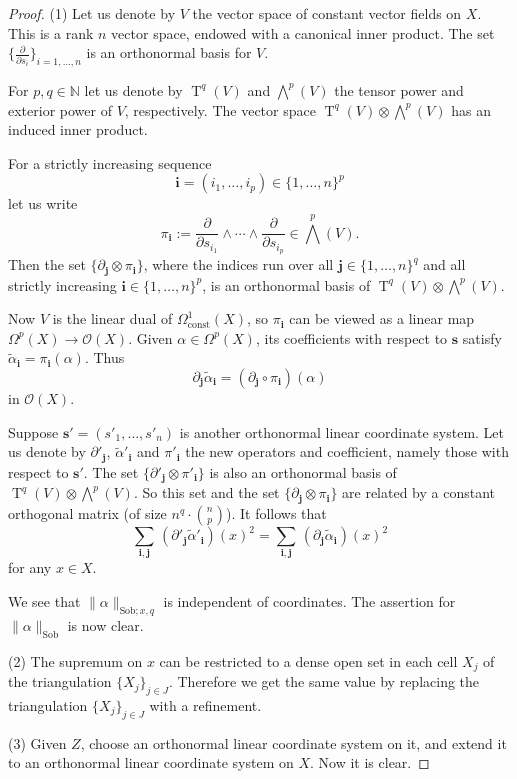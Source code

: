\documentclass[10pt, a4paper]{amsart}
\theoremstyle{definition}
\numberwithin{equation}{section}
\newcommand{\opn}{\operatorname}
\newcommand{\mcal}[1]{\mathcal{#1}}
\newcommand{\mrm}[1]{\mathrm{#1}}
\newcommand{\mbb}[1]{\mathbb{#1}}
\newcommand{\smfrac}[2]{{\textstyle \frac{#1}{#2}}}
\newcommand{\bsym}[1]{\boldsymbol{#1}}
\newcommand{\til}[1]{\tilde{#1}}
\newcommand{\norm}[1]{\lVert #1 \rVert}
\newcommand{\N}{\mbb{N}}
\newcommand{\bwedge}{{\textstyle \bigwedge}}
\begin{document}
\begin{proof}
(1) Let us denote by $V$ the vector space of constant vector fields on $X$.
This is a rank $n$ vector space, endowed with a canonical inner product. The
set $\{ \smfrac{\partial}{\partial s_i} \}_{i = 1, \ldots, n}$
is an orthonormal basis for $V$. 

For $p, q \in \N$ let us denote by $\opn{T}^q(V)$ and $\bwedge^p(V)$ the 
tensor  power and exterior power of $V$, respectively. The vector space
$\opn{T}^q(V) \otimes \bwedge^p(V)$ has an induced  inner product.

For a strictly increasing sequence 
\[ \bsym{i}   = (i_1, \ldots, i_p) \in \{ 1, \ldots, n \}^p \] 
let us write
\[ \pi_{\bsym{i}} := 
\smfrac{\partial}{\partial s_{i_1}} \wedge \cdots \wedge 
\smfrac{\partial}{\partial s_{i_p}} \in \bwedge^p(V) . \]
Then the set 
$\{ \partial_{\bsym{j}} \otimes \pi_{\bsym{i}} \}$,
where the indices run over all $\bsym{j} \in \{ 1, \ldots, n \}^q$ and  all
strictly increasing $\bsym{i} \in \{ 1, \ldots, n \}^p$,
is an orthonormal basis of $\opn{T}^q(V) \otimes \bwedge^p(V)$.

Now $V$ is the linear dual of $\Omega^1_{\mrm{const}}(X)$, so 
$\pi_{\bsym{i}}$ can be viewed as a linear map
$ \Omega^p(X) \to \mcal{O}(X)$.
Given $\alpha \in \Omega^p(X)$, its coefficients with respect to $\bsym{s}$
satisfy
$\til{\alpha}_{\bsym{i}} = \pi_{\bsym{i}}(\alpha)$.
Thus
\[ \partial_{\bsym{j}} \til{\alpha}_{\bsym{i}} = 
(\partial_{\bsym{j}} \circ \pi_{\bsym{i}})(\alpha) \]
in $\mcal{O}(X)$.
  
Suppose $\bsym{s}' = (s'_1, \ldots, s'_n)$ is another orthonormal
linear coordinate system. Let us denote by 
$\partial'_{\bsym{j}}$, $\til{\alpha}'_{\bsym{i}}$ and $\pi'_{\bsym{i}}$ the
new operators and coefficient, namely those with respect to $\bsym{s}'$. The
set 
$\{ \partial'_{\bsym{j}} \otimes \pi'_{\bsym{i}} \}$
is also an orthonormal basis of $\opn{T}^q(V) \otimes \bwedge^p(V)$.
So this set and the set 
$\{ \partial_{\bsym{j}} \otimes \pi_{\bsym{i}} \}$
are related by a constant orthogonal matrix (of size $n^q \cdot \binom{n}{p}$).
It follows that
\[ \sum_{\bsym{i}, \bsym{j}} \, 
(\partial'_{\bsym{j}} \til{\alpha}'_{\bsym{i}})(x)^2 =
\sum_{\bsym{i}, \bsym{j}} \, 
(\partial_{\bsym{j}} \til{\alpha}_{\bsym{i}})(x)^2 
 \]
for any $x \in X$. 

We see that $\norm{\alpha}_{\mrm{Sob}; x, q}$
is independent of coordinates. The assertion for 
$\norm{\alpha}_{\mrm{Sob}}$ is now clear.

\medskip  \noindent
(2) The supremum on $x$ can be restricted to a dense open set in each cell
$X_j$ of the triangulation $\{ X_j \}_{j \in J}$. Therefore we get the same
value by replacing the triangulation $\{ X_j \}_{j \in J}$ with a refinement. 

\medskip  \noindent
(3) Given $Z$, choose an orthonormal linear coordinate system on it, and extend
it to an orthonormal linear coordinate system on $X$. Now it is clear.
\end{proof}
\end{document}
